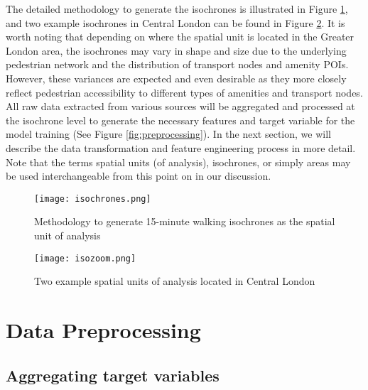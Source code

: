 The detailed methodology to generate the isochrones is illustrated in Figure \ref{fig:isochrones}, and two example isochrones in Central London can be found in Figure \ref{fig:isozoom}. It is worth noting that depending on where the spatial unit is located in the Greater London area, the isochrones may vary in shape and size due to the underlying pedestrian network and the distribution of transport nodes and amenity POIs. However, these variances are expected and even desirable as they more closely reflect pedestrian accessibility to different types of amenities and transport nodes. All raw data extracted from various sources will be aggregated and processed at the isochrone level to generate the necessary features and target variable for the model training (See Figure \ref{fig:preprocessing}). In the next section, we will describe the data transformation and feature engineering process in more detail. Note that the terms spatial units (of analysis), isochrones, or simply areas may be used interchangeable from this point on in our discussion.

\begin{figure}[ht]
    \centering
    \texttt{[image: isochrones.png]}
    \captionsetup{justification=centering}
    \caption{Methodology to generate 15-minute walking isochrones as the spatial unit of analysis}
    \label{fig:isochrones}
\end{figure}

\begin{figure}[!ht]
    \centering
    \texttt{[image: isozoom.png]}
    \caption{Two example spatial units of analysis located in Central London}
    \label{fig:isozoom}
\end{figure}




\pagebreak[4] %
\section{Data Preprocessing}
\subsection{Aggregating target variables}


